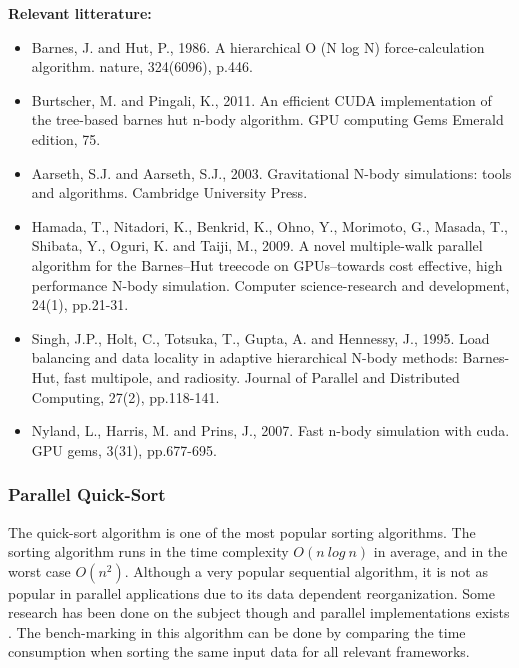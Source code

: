 \documentclass{article}
\begin{document}
\vspace{5mm}
\noindent \textbf{Relevant litterature:}
\begin{itemize}
    \item Barnes, J. and Hut, P., 1986. A hierarchical O (N log N) force-calculation algorithm. nature, 324(6096), p.446. \cite{barnes1986hierarchical}
    \item Burtscher, M. and Pingali, K., 2011. An efficient CUDA implementation of the tree-based barnes hut n-body algorithm. GPU computing Gems Emerald edition, 75. \cite{burtscher2011efficient}
    \item Aarseth, S.J. and Aarseth, S.J., 2003. Gravitational N-body simulations: tools and algorithms. Cambridge University Press. \cite{aarseth2003gravitational}
    \item Hamada, T., Nitadori, K., Benkrid, K., Ohno, Y., Morimoto, G., Masada, T., Shibata, Y., Oguri, K. and Taiji, M., 2009. A novel multiple-walk parallel algorithm for the Barnes–Hut treecode on GPUs–towards cost effective, high performance N-body simulation. Computer science-research and development, 24(1), pp.21-31. \cite{hamada2009novel}
    \item Singh, J.P., Holt, C., Totsuka, T., Gupta, A. and Hennessy, J., 1995. Load balancing and data locality in adaptive hierarchical N-body methods: Barnes-Hut, fast multipole, and radiosity. Journal of Parallel and Distributed Computing, 27(2), pp.118-141. \cite{singh1995load}
    \item Nyland, L., Harris, M. and Prins, J., 2007. Fast n-body simulation with cuda. GPU gems, 3(31), pp.677-695. \cite{nyland2007fast}
\end{itemize}

\subsubsection{Parallel Quick-Sort}
The quick-sort algorithm is one of the most popular sorting algorithms. The sorting algorithm runs in the time complexity  $O(n \ log \ n)$ in average, and in the worst case  $O(n^2)$. Although a very popular sequential algorithm, it is not as popular in parallel applications due to its data dependent reorganization. Some research has been done on the subject though and parallel implementations exists \cite{sanders1997efficient}\cite{tsigas2003simple}\cite{manca2016cuda}. The bench-marking in this algorithm can be done by comparing the time consumption when sorting the same input data for all relevant frameworks.
\end{document}
